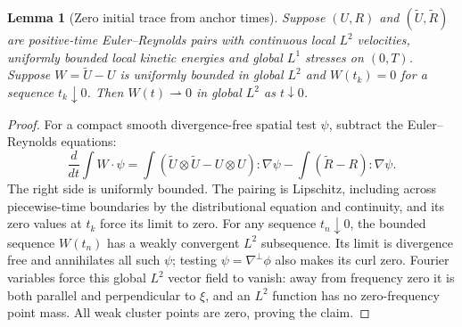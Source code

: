 \documentclass[11pt]{article}
\newtheorem{lemma}[theorem]{Lemma}
\theoremstyle{remark}\newtheorem{remark}[theorem]{Remark}
\begin{document}
\begin{lemma}[Zero initial trace from anchor times]\label{lem:anchors}
Suppose $(U,R)$ and $(\widetilde U,\widetilde R)$ are positive-time
Euler--Reynolds pairs with continuous local $L^2$ velocities, uniformly
bounded local kinetic energies and global $L^1$ stresses on $(0,T)$.
Suppose $W=\widetilde U-U$ is uniformly bounded in global $L^2$ and
$W(t_k)=0$ for a sequence $t_k\downarrow0$. Then $W(t)\rightharpoonup0$
in global $L^2$ as $t\downarrow0$.
\end{lemma}
\begin{proof}
For a compact smooth divergence-free spatial test $\psi$, subtract the
Euler--Reynolds equations:
\[
 \frac d{dt}\int W\cdot\psi
 =\int(\widetilde U\otimes\widetilde U-U\otimes U):\nabla\psi
 -\int(\widetilde R-R):\nabla\psi.
\]
The right side is uniformly bounded. The pairing is Lipschitz, including
across piecewise-time boundaries by the distributional equation and
continuity, and its zero values at $t_k$ force its limit to zero.
For any sequence $t_n\downarrow0$, the bounded sequence $W(t_n)$ has a weakly convergent $L^2$ subsequence. Its limit
is divergence free and annihilates all such $\psi$; testing
$\psi=\nabla^\perp\phi$ also makes its curl zero. Fourier variables force
this global $L^2$ vector field to vanish: away from frequency zero it is
both parallel and perpendicular to $\xi$, and an $L^2$ function has no
zero-frequency point mass. All weak cluster points are zero, proving the claim.
\end{proof}
\end{document}

